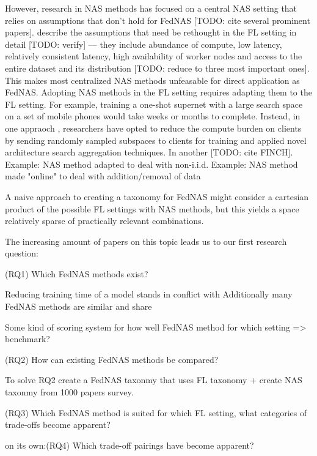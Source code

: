 However, research in NAS methods has focused on a central NAS setting that relies on assumptions that don't hold for FedNAS [TODO: cite several prominent papers]. \cite{fl_advances_and_open_problems_2021} describe the assumptions that need be rethought in the FL setting in detail [TODO: verify] — they include abundance of compute, low latency, relatively consistent latency, high availability of worker nodes and access to the entire dataset and its distribution [TODO: reduce to three most important ones]. This makes most centralized NAS methods unfeasable for direct application as FedNAS. Adopting NAS methods in the FL setting requires adapting them to the FL setting. 
For example, training a one-shot supernet with a large search space on a set of mobile phones would take weeks or months to complete. Instead, in one appraoch \cite{fedoras_2022}, researchers have opted to reduce the compute burden on clients by sending randomly sampled subspaces to clients for training and applied novel architecture search aggregation techniques. In another [TODO: cite FINCH].
Example: NAS method adapted to deal with non-i.i.d.
Example: NAS method made "online" to deal with addition/removal of data

A naive approach to creating a taxonomy for FedNAS might consider a cartesian product of the possible FL settings with NAS methods, but this yields a space relatively sparse of practically relevant combinations.

The increasing amount of papers on this topic leads us to our first research question: 

(RQ1) Which FedNAS methods exist? 

Reducing training time of a model stands in conflict with  
Additionally many FedNAS methods are similar and share 

Some kind of scoring system for how well FedNAS method for which setting => benchmark?

(RQ2) How can existing FedNAS methods be compared?

To solve RQ2 create a FedNAS taxonmy that uses FL taxonomy + create NAS taxonmy from 1000 papers survey.

(RQ3) Which FedNAS method is suited for which FL setting, what categories of trade-offs become apparent?

on its own:(RQ4) Which trade-off pairings have become apparent?


